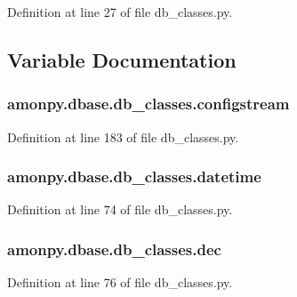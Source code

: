 Definition at line 27 of file db\-\_\-classes.\-py.



\subsection{Variable Documentation}
\hypertarget{namespaceamonpy_1_1dbase_1_1db__classes_ab30adbc67829605bf3c2993784b348b4}{
\subsubsection[{configstream}]{\setlength{\rightskip}{0pt plus 5cm}amonpy.\-dbase.\-db\-\_\-classes.\-configstream}}\label{namespaceamonpy_1_1dbase_1_1db__classes_ab30adbc67829605bf3c2993784b348b4}


Definition at line 183 of file db\-\_\-classes.\-py.

\hypertarget{namespaceamonpy_1_1dbase_1_1db__classes_ae78b921654586e117c92fec127c99be1}{
\subsubsection[{datetime}]{\setlength{\rightskip}{0pt plus 5cm}amonpy.\-dbase.\-db\-\_\-classes.\-datetime}}\label{namespaceamonpy_1_1dbase_1_1db__classes_ae78b921654586e117c92fec127c99be1}


Definition at line 74 of file db\-\_\-classes.\-py.

\hypertarget{namespaceamonpy_1_1dbase_1_1db__classes_ae45e4ba2ed3d299db4f4499e229453e4}{
\subsubsection[{dec}]{\setlength{\rightskip}{0pt plus 5cm}amonpy.\-dbase.\-db\-\_\-classes.\-dec}}\label{namespaceamonpy_1_1dbase_1_1db__classes_ae45e4ba2ed3d299db4f4499e229453e4}


Definition at line 76 of file db\-\_\-classes.\-py.

